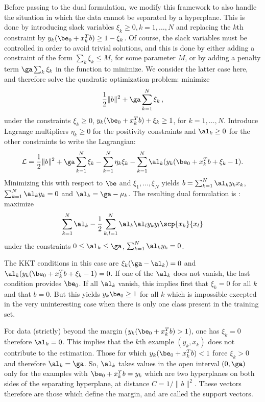 Before passing to the dual formulation, we modify this framework
to also handle the situation in which the data cannot be separated by
a hyperplane. This is done by introducing slack variables $\xi_k \geq
0, k=1, \ldots, N$ and replacing the $k$th constraint by $y_k(\be_0 +
x_k^T b)
\geq 1 -\xi_k$. Of course, the slack variables must be controlled in
order to avoid trivial solutions, and this is done by either adding a
constraint of the form $\sum_k\xi_k \leq M$, for some parameter $M$,
or by adding a penalty term $\ga \sum_k \xi_k$ in the function to
minimize. We consider the latter case here, and therefore solve the
quadratic optimization problem: minimize
$$
\frac{1}{2} \|b\|^2 + \ga \sum_{k=1}^N \xi_k\,,
$$
under the constraints $\xi_k \geq 0$, $y_k(\be_0 + x_k^T b) + \xi_k
\geq 1$, for $k=1, \ldots, N$. Introduce Lagrange multipliers
$\eta_k\geq 0$
for the positivity constraints and $\al_k\geq 0$ for the other constraints to
write the Lagrangian:
$$
\mathcal L = \frac{1}{2} \|b\|^2 + \ga \sum_{k=1}^N \xi_k - \sum_{k=1}^N
\eta_k\xi_k -  \sum_{k=1}^N \al_k (y_k(\be_0 + x_k^T b +\xi_k - 1).
$$
Minimizing this with respect to $\be$ and $\xi_1, \ldots, \xi_N$
yields $b = \sum_{k=1}^N \al_k y_k x_k$, $\sum_{k=1}^N \al_ky_k  = 0$
and $\al_k = \ga - \mu_k$. The resulting dual formulation is :
maximize
$$
\sum_{k=1}^N \al_k - \frac{1}{2} \sum_{k,l=1}^N \al_k\al_l y_ky_l
\scp{x_k}{x_l}
$$
under the constraints $0\leq \al_k\leq \ga$, $\sum_{k=1}^N \al_k y_k =
0$. 

The KKT conditions in this case are $\xi_k(\ga-\al_k) = 0$ and 
$\al_k (y_k(\be_0 + x_k^Tb +\xi_k - 1) = 0$. If one of the $\al_k$ does
not vanish, the last condition provides $\be_0$.  If all
$\al_k$ vanish, this implies first that $\xi_k = 0$ for all $k$ and
that $b = 0$.  But this yields $y_k \be_0 \geq 1$ for all $k$ which is
impossible excepted in the very uninteresting case when there is only
one class present in the training set.

For data (strictly) beyond the margin ($y_k(\be_0 + x_k^T b ) > 1$),
one has $\xi_k=0$ therefore $\al_k=0$. This implies that the $k$th
example $(y_k, x_k)$ does not contribute to the estimation. Those for
which  $y_k(\be_0 + x_k^Tb ) < 1$  force $\xi_k
> 0$ and therefore $\al_k = \ga$. So, $\al_k$ takes values in the open
interval $(0, \ga)$ only for the examples with  $\be_0 + x_k^T b = y_k$
which are two hyperplanes on both sides of the separating hyperplane,
at distance $C  = 1/\|b\|^2$. These vectors therefore are those which
define the margin, and are called the support vectors.






